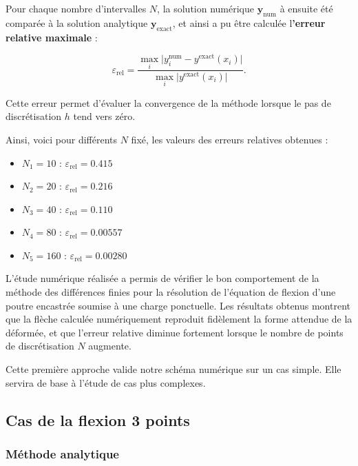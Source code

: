 \documentclass[12pt, a4paper]{article}
\begin{document}
Pour chaque nombre d’intervalles $N$, la solution numérique $\mathbf{y}_{\text{num}}$ à ensuite été comparée à la solution analytique $\mathbf{y}_{\text{exact}}$, et ainsi a pu être calculée l\textbf{'erreur relative maximale} :

\[
\varepsilon_{\text{rel}} = \frac{\max_i \big|y^{\text{num}}_i - y^{\text{exact}}(x_i)\big|}{\max_i \big|y^{\text{exact}}(x_i)\big|}.
\]

Cette erreur permet d’évaluer la convergence de la méthode lorsque le pas de discrétisation $h$ tend vers zéro.  

Ainsi, voici pour différents $N$ fixé, les valeurs des erreurs relatives obtenues : 

\begin{itemize}
    \item[\textbullet]$N_1 = 10$ : $\varepsilon_{\text{rel}} = 0.415$
    \item[\textbullet]$N_2 = 20$ : $\varepsilon_{\text{rel}} = 0.216$
    \item[\textbullet]$N_3 = 40$ : $\varepsilon_{\text{rel}} = 0.110$
    \item[\textbullet]$N_4 = 80$ : $\varepsilon_{\text{rel}} = 0.00557$
    \item[\textbullet]$N_5 = 160$ : $\varepsilon_{\text{rel}} = 0.00280$
\end{itemize}

\vspace{1em}

L’étude numérique réalisée a permis de vérifier le bon comportement de la méthode des différences finies pour la résolution de l’équation de flexion d’une poutre encastrée soumise à une charge ponctuelle.  
Les résultats obtenus montrent que la flèche calculée numériquement reproduit fidèlement la forme attendue de la déformée, et que l’erreur relative diminue fortement lorsque le nombre de points de discrétisation $N$ augmente.  

Cette première approche valide notre schéma numérique sur un cas simple. Elle servira de base à l’étude de cas plus complexes. 

\subsection{\textbf{Cas de la flexion 3 points}}

\subsubsection{\textbf{Méthode analytique}}
\end{document}
